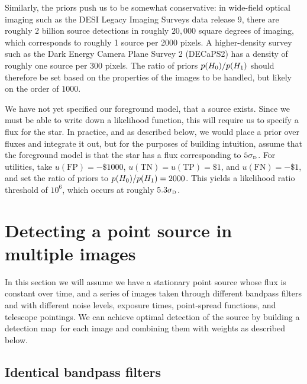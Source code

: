 \documentclass[11pt,letterpaper,linenumbers]{aastex63}
\newcommand{\detmap}{detection map}
\newcommand{\sigd}{\sigma_{\mbox{\rmfamily\tiny D}}}
\newcommand{\truepos}{\ensuremath{\mathrm{TP}}}
\newcommand{\falsepos}{\ensuremath{\mathrm{FP}}}
\newcommand{\trueneg}{\ensuremath{\mathrm{TN}}}
\newcommand{\falseneg}{\ensuremath{\mathrm{FN}}}
\begin{document}
Similarly, the priors push us to be somewhat conservative: in
wide-field optical imaging such as the DESI Legacy Imaging Surveys
\citep{lsoverview} data release 9, there are roughly 2 billion source
detections in roughly $20,000$ square degrees of imaging, which
corresponds to roughly 1 source per 2000 pixels.  A higher-density
survey such as the Dark Energy Camera Plane Survey 2 (DECaPS2)
\citep{decaps2} has a density of roughly one source per 300 pixels.
The ratio of priors $p(H_0) / p(H_1)$ should therefore be set based on
the properties of the images to be handled, but likely on the order of
$1000$.

We have not yet specified our foreground model, that a source exists.
Since we must be able to write down a likelihood function, this will
require us to specify a flux for the star.  In practice, and as
described below, we would place a prior over fluxes and integrate it
out, but for the purposes of building intuition, assume that the
foreground model is that the star has a flux corresponding to
$5 \sigd$.  For utilities, take $u(\falsepos) = -\$1000$, 
$u(\trueneg) = u(\truepos) = \$1$, and $u(\falseneg) = -\$1$, and
set the ratio of priors to $p(H_0)/p(H_1) = 2000$.
This yields a likelihood ratio threshold of $10^6$, which occurs at
roughly $5.3 \sigd$.






\section{Detecting a point source in multiple images}

In this section we will assume we have a stationary point source whose
flux is constant over time, and a series of images taken through
different bandpass filters and with different noise levels, exposure
times, point-spread functions, and telescope pointings.  We can
achieve optimal detection of the source by building a \detmap\ for
each image and combining them with weights as described below.



\subsection{Identical bandpass filters}
\end{document}
